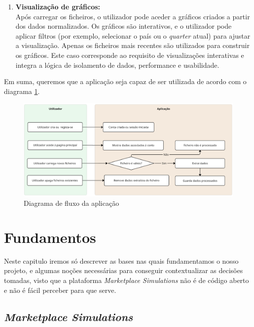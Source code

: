 \begin{enumerate}
    \item \textbf{Visualização de gráficos: } \\
    Após carregar os ficheiros, o utilizador pode aceder a gráficos criados a partir dos dados normalizados. Os gráficos são interativos, e o utilizador pode aplicar filtros (por exemplo, selecionar o país ou o \textit{quarter} atual) para ajustar a visualização. Apenas os ficheiros mais recentes são utilizados para construir os gráficos. Este caso corresponde ao requisito de visualizações interativas e integra a lógica de isolamento de dados, performance e usabilidade.
    
\end{enumerate}

Em suma, queremos que a aplicação seja capaz de ser utilizada de acordo com o diagrama \ref{fig:flowchart}.

\begin{figure}[H]
    \centering
    \includegraphics[max width=\textwidth]{./img/flowchart.png}
 \caption{Diagrama de fluxo da aplicação}
 \label{fig:flowchart}
 \end{figure}

\section{Fundamentos}
\label{sec:fundamentos}

Neste capitulo iremos só descrever as bases nas quais fundamentamos o nosso projeto, e algumas noções necessárias para conseguir contextualizar as decisões tomadas, visto que a plataforma \textit{Marketplace Simulations} \cite{MarketplaceSim_2025} não é de código aberto e não é fácil perceber para que serve.

\subsection{\textit{Marketplace Simulations} \cite{MarketplaceSim_2025}}
\label{sec:marketplace}

